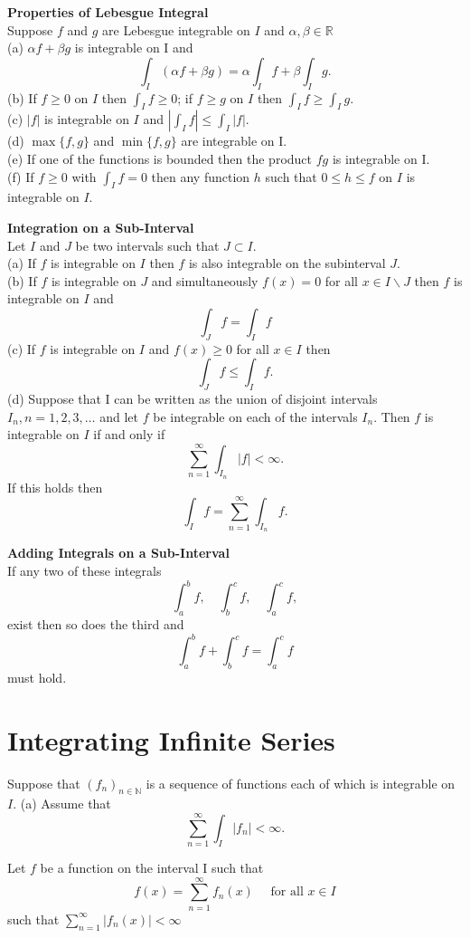 \documentclass[a4paper, 10pt]{article}
\begin{document}
\begin{multicols*}{3}
\textbf{Properties of Lebesgue Integral}\\
Suppose $f$ and $g$ are Lebesgue integrable on $I$ and $\alpha,\beta\in\mathbb{R}$\\
(a) $\alpha f+\beta g$ is integrable on I and
$$
\int_I(\alpha f+\beta g)=\alpha \int_I f+\beta \int_I g .
$$
(b) If $f \geq 0$ on $I$ then $\int_I f \geq 0$; if $f \geq g$ on $I$ then $\int_I f \geq \int_I g$.\\
(c) $|f|$ is integrable on $I$ and $\left|\int_I f\right| \leq \int_I|f|$.\\
(d) $\max \{f, g\}$ and $\min \{f, g\}$ are integrable on I.\\
(e) If one of the functions is bounded then the product $f g$ is integrable on I.\\
(f) If $f \geq 0$ with $\int_I f=0$ then any function $h$ such that $0 \leq h \leq f$ on $I$ is integrable on $I$.

\textbf{Integration on a Sub-Interval}\\
Let $I$ and $J$ be two intervals such that $J \subset I$.\\
(a) If $f$ is integrable on $I$ then $f$ is also integrable on the subinterval $J$.\\
(b) If $f$ is integrable on $J$ and simultaneously $f(x)=0$ for all $x \in I \backslash J$ then $f$ is integrable on $I$ and
$$
\int_J f=\int_I f
$$
(c) If $f$ is integrable on $I$ and $f(x) \geq 0$ for all $x \in I$ then
$$
\int_J f \leq \int_I f .
$$
(d) Suppose that I can be written as the union of disjoint intervals $I_n, n=1,2,3, \ldots$ and let $f$ be integrable on each of the intervals $I_n$. Then $f$ is integrable on $I$ if and only if
$$
\sum_{n=1}^{\infty} \int_{I_n}|f|<\infty .
$$
If this holds then
$$
\int_I f=\sum_{n=1}^{\infty} \int_{I_n} f .
$$

\textbf{Adding Integrals on a Sub-Interval}\\
If any two of these integrals
$$
\int_a^b f, \quad \int_b^c f, \quad \int_a^c f,
$$
exist then so does the third and
$$
\int_a^b f+\int_b^c f=\int_a^c f
$$
must hold.


\section*{Integrating Infinite Series}
Suppose that $\left(f_n\right)_{n \in \mathbb{N}}$ is a sequence of functions each of which is integrable on $I$.
(a) Assume that
$$
\sum_{n=1}^{\infty} \int_I\left|f_n\right|<\infty .
$$

Let $f$ be a function on the interval I such that
$$
f(x)=\sum_{n=1}^{\infty} f_n(x) \quad \text { for all } x \in I $$
such that $\sum_{n=1}^{\infty}\left|f_n(x)\right|<\infty$


\end{multicols*}
\end{document}
